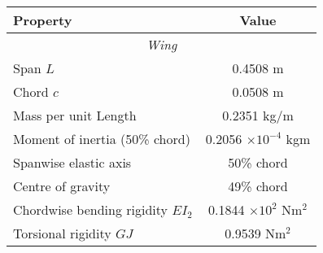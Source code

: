 \documentclass{standalone}
\begin{document}
    \centering
    \begin{tabular}{l c}
    \toprule
    \toprule
    Property&Value\\
    \midrule
    \multicolumn{2}{c}{\textit{Wing}}\\
    Span $L$     & 0.4508 m  \\
    Chord $c$   & 0.0508 m \\
    Mass per unit Length     & 0.2351 kg/m\\
    Moment of inertia (50\% chord)  & 0.2056 $\times 10^{-4}$ kgm\\
    Spanwise elastic axis   & 50\% chord\\
    Centre of gravity   & 49\% chord\\
    Chordwise bending rigidity $EI_2$   & 0.1844 $\times 10^2$ Nm$^2$\\
    Torsional rigidity $GJ$ & 0.9539 Nm$^2$\\
    \bottomrule
    \bottomrule
    \end{tabular}
    
\end{document}
